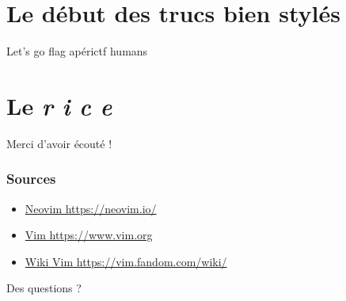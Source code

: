 \documentclass[10pt]{beamer}
\begin{document}
\section{Le début des trucs bien stylés}
	\begin{frame}{Let's go flag}
		apérictf humans
	\end{frame}
	
\section{Le \textit{r i c e}}

\begin{appendix}

	\begin{frame}[standout]
		Merci d'avoir écouté !
	\end{frame}

	\begin{frame}
		\frametitle{Sources}
		\begin{itemize}
			\item \href{https://neovim.io/}{Neovim https://neovim.io/}
			\item \href{https://www.vim.org}{Vim https://www.vim.org}
			\item \href{https://vim.fandom.com/wiki/}{Wiki Vim https://vim.fandom.com/wiki/}
		\end{itemize}
	\end{frame}

	\begin{frame}[standout]
		Des questions ?
	\end{frame}

\end{appendix}
\end{document}
